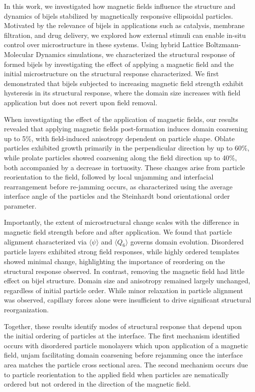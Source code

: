 In this work, we investigated how magnetic fields influence the structure and dynamics of bijels stabilized by magnetically responsive ellipsoidal particles. Motivated 
by the relevance of bijels in applications such as catalysis, membrane filtration, and drug delivery, we explored how external stimuli can enable in-situ control over 
microstructure in these systems. Using hybrid Lattice Boltzmann-Molecular Dynamics simulations, we characterized the structural response of formed bijels by investigating
the effect of applying a magnetic field and the initial microstructure on the structural response characterized. We first demonstrated that bijels subjected to increasing 
magnetic field strength exhibit hysteresis in its structural response, where the domain size increases with field application but does not revert upon field removal.

When investigating the effect of the application of magnetic fields, our results revealed that applying magnetic fields post-formation induces domain coarsening up to 5\%, with 
field-induced anisotropy dependent on particle shape. Oblate particles exhibited growth primarily in the perpendicular direction by up to 60\%, while prolate particles showed coarsening 
along the field direction up to 40\%, 
both accompanied by a decrease in tortuosity. These changes arise from particle reorientation to the field, followed by local unjamming and interfacial rearrangement before 
re-jamming occurs, as characterized using the average interface angle of the particles and the Steinhardt bond orientational order parameter.

Importantly, the extent of microstructural change scales with the difference in magnetic field strength before and after application. We found that particle alignment 
characterized via $\langle \psi \rangle$ and $\langle Q_6 \rangle$ governs domain evolution. Disordered particle layers exhibited strong field responses, while highly ordered 
templates showed minimal change, highlighting the importance of reordering on the structural response observed. In contrast, removing the magnetic field had little effect 
on bijel structure. Domain size and anisotropy remained largely unchanged, regardless of initial particle order. While minor relaxation in particle alignment was observed, 
capillary forces alone were insufficient to drive significant structural reorganization.

Together, these results identify modes of structural response that depend upon the initial ordering of particles at the interface. The first mechanism identified occurs with
disordered particle monolayers which upon application of a magnetic field, unjam facilitating domain coarsening before rejamming once the interface area matches the 
particle cross sectional area. The second mechanism occurs due to particle reorientation to the applied field when particles are nematically ordered but not ordered in the direction
of the magnetic field. 

